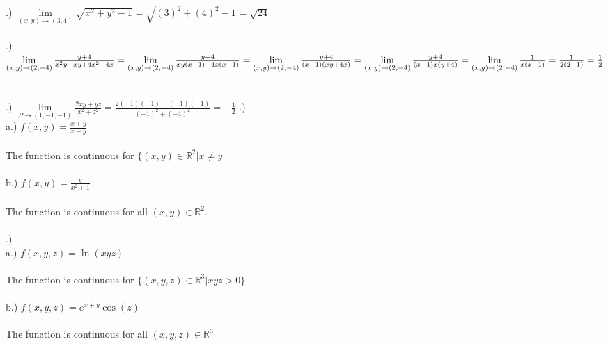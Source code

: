 \documentclass[12pt]{article}
\begin{document}
.) $\lim\limits_{(x,y) \to (3,4)} \sqrt{x^{2} + y^{2} - 1} = \sqrt{(3)^{2} + (4)^{2} -1} = \sqrt{24}$\\\\
.) $\lim\limits_{(x,y) \to (2,-4)} \frac{y+4}{x^{2}y -xy + 4x^{2} - 4x} 
\\\\= \lim\limits_{(x,y) \to (2,-4)} \frac{y+4}{xy(x-1)+4x(x-1)}
\\\\=\lim\limits_{(x,y) \to (2,-4)} \frac{y+4}{(x-1)(xy +4x)} 
\\\\=\lim\limits_{(x,y) \to (2,-4)} \frac{y+4}{(x-1)x(y +4)}
\\\\= \lim\limits_{(x,y) \to (2,-4)} \frac{1}{x(x-1)} = \frac{1}{2(2-1)} = \frac{1}{2}$\\\\\\

.) $\lim\limits_{P \to (1, -1, -1)}\frac{2xy+yz}{x^{2}+z^{2}} = \frac{2(-1)(-1) + (-1)(-1)}{(-1)^{2} + (-1)^{2}} = -\frac{1}{2}$
\clearpage
{}.) \\
\noindent a.) $f(x, y) = \frac{x+y}{x-y}$\\\\
\noindent The function is continuous for $\{ (x,y) \in \mathbb{R}^{2} | x \neq y$\\\\
\noindent b.) $f(x,y) = \frac{y}{x^{2} + 1}$\\\\
\noindent The function is continuous for all $ (x,y) \in \mathbb{R}^{2}$.\\\\
.) \\
\noindent a.) $f(x, y,z) = \ln(xyz)$\\\\
\noindent The function is continuous for $\{ (x,y,z) \in \mathbb{R}^{3} | xyz > 0\}$\\\\
\noindent b.) $f(x, y,z) = e^{x+y}\cos(z)$\\\\
\noindent The function is continuous for all $(x,y,z) \in \mathbb{R}^3$\\\\
\end{document}
